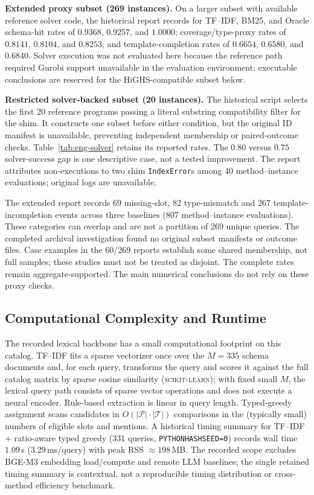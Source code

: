 \medskip\noindent\textbf{Extended proxy subset (269 instances).}
On a larger subset with available reference solver code, the historical report records for TF--IDF, BM25, and Oracle schema-hit rates of $0.9368$, $0.9257$, and $1.0000$; coverage/type-proxy rates of $0.8141$, $0.8104$, and $0.8253$; and template-completion rates of $0.6654$, $0.6580$, and $0.6840$. Solver execution was not evaluated here because the reference path required Gurobi support unavailable in the evaluation environment; executable conclusions are reserved for the HiGHS-compatible subset below.

\medskip\noindent\textbf{Restricted solver-backed subset (20 instances).}
The historical script selects the first 20 reference programs passing a literal substring compatibility filter for the shim. It constructs one subset before either condition, but the original ID manifest is unavailable, preventing independent membership or paired-outcome checks. Table~\ref{tab:eng-solver} retains its reported rates. The $0.80$ versus $0.75$ solver-success gap is one descriptive case, not a tested improvement. The report attributes non-executions to two shim \texttt{IndexError}s among 40 method--instance evaluations; original logs are unavailable.



The extended report records 69 missing-slot, 82 type-mismatch and 267 template-incompletion events across three baselines (807 method--instance evaluations). These categories can overlap and are not a partition of 269 unique queries. The completed archival investigation found no original subset manifests or outcome files. Case examples in the 60/269 reports establish some shared membership, not full samples; these studies must not be treated as disjoint. The complete rates remain aggregate-supported. The main numerical conclusions do not rely on these proxy checks.


\subsection{Computational Complexity and Runtime}
\label{app:runtime-details}

The recorded lexical backbone has a small computational footprint on this catalog. TF--IDF fits a sparse vectorizer once over the $M=335$ schema documents and, for each query, transforms the query and scores it against the full catalog matrix by sparse cosine similarity (\textsc{scikit-learn}); with fixed small $M$, the lexical query path consists of sparse vector operations and does not execute a neural encoder. Rule-based extraction is linear in query length. Typed-greedy assignment scans candidates in $O(|\mathcal{P}|\cdot|\mathcal{T}|)$ comparisons in the (typically small) numbers of eligible slots and mentions. A historical timing summary for TF--IDF + ratio-aware typed greedy (331 queries, \texttt{PYTHONHASHSEED=0}) records wall time $1.09$\,s ($3.29$\,ms/query) with peak RSS $\approx 198$\,MB. The recorded scope excludes BGE-M3 embedding load/compute and remote LLM baselines; the single retained timing summary is contextual, not a reproducible timing distribution or cross-method efficiency benchmark.


